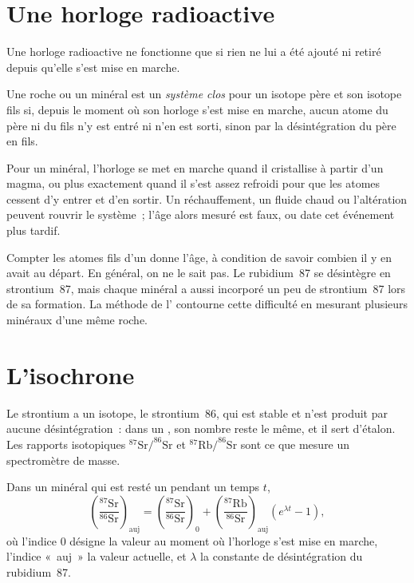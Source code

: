 \section{Une horloge radioactive}

Une horloge radioactive ne fonctionne que si rien ne lui a été ajouté ni
retiré depuis qu'elle s'est mise en marche.

\begin{definition}\label{def:g12:age-of-the-earth:closed-system}
Une roche ou un minéral est un \emph{système clos}
pour un isotope père et son isotope fils si, depuis le moment où son
horloge s'est mise en marche, aucun atome du père ni du fils n'y est entré
ni n'en est sorti, sinon par la désintégration du père en fils.
\end{definition}

Pour un minéral, l'horloge se met en marche quand il cristallise à partir
d'un magma, ou plus exactement quand il s'est assez refroidi pour que les
atomes cessent d'y entrer et d'en sortir. Un réchauffement, un fluide chaud
ou l'altération peuvent rouvrir le système~; l'âge alors mesuré est faux,
ou date cet événement plus tardif.

Compter les atomes fils d'un  donne l'âge, à condition de
savoir combien il y en avait au départ. En général, on ne le sait pas. Le
rubidium~87 se désintègre en strontium~87, mais chaque minéral a aussi
incorporé un peu de strontium~87 lors de sa formation. La méthode de
l' contourne cette difficulté en mesurant plusieurs minéraux d'une
même roche.

\section{L'isochrone}

Le strontium a un isotope, le strontium~86, qui est stable et n'est produit
par aucune désintégration~: dans un , son nombre reste le même,
et il sert d'étalon. Les rapports isotopiques $^{87}\mathrm{Sr}/^{86}\mathrm{Sr}$ et
$^{87}\mathrm{Rb}/^{86}\mathrm{Sr}$ sont ce que mesure un spectromètre de
masse.

\begin{theorem}\label{thm:g12:age-of-the-earth:isochron}
Dans un minéral qui est resté un  pendant un temps $t$,
\[
  \left(\frac{^{87}\mathrm{Sr}}{^{86}\mathrm{Sr}}\right)_{\text{auj}}
  = \left(\frac{^{87}\mathrm{Sr}}{^{86}\mathrm{Sr}}\right)_{0}
  + \left(\frac{^{87}\mathrm{Rb}}{^{86}\mathrm{Sr}}\right)_{\text{auj}}
  \left(e^{\lambda t} - 1\right),
\]
où l'indice 0 désigne la valeur au moment où l'horloge s'est mise en
marche, l'indice «~auj~» la valeur actuelle, et $\lambda$ la constante de
désintégration du rubidium~87.
\end{theorem}

